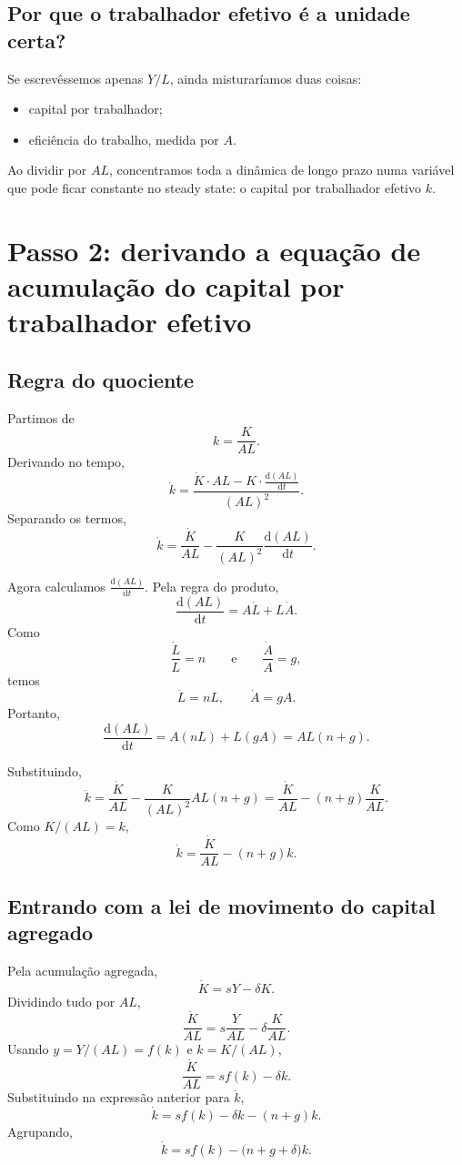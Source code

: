 \documentclass[11pt,a4paper]{article}
\newcommand{\dd}{\mathrm{d}}
\begin{document}
\subsection{Por que o trabalhador efetivo \'e a unidade certa?}

Se escrev\^essemos apenas \(Y/L\), ainda misturar\'iamos duas coisas:
\begin{itemize}
  \item capital por trabalhador;
  \item efici\^encia do trabalho, medida por \(A\).
\end{itemize}
Ao dividir por \(AL\), concentramos toda a din\^amica de longo prazo numa
vari\'avel que pode ficar constante no steady state: o capital por trabalhador
efetivo \(k\).

\section{Passo 2: derivando a equa\c{c}\~ao de acumula\c{c}\~ao do capital por trabalhador efetivo}

\subsection{Regra do quociente}

Partimos de
\[
k=\frac{K}{AL}.
\]
Derivando no tempo,
\[
\dot{k}
=
\frac{\dot K\cdot AL-K\cdot \frac{\dd(AL)}{\dd t}}{(AL)^2}.
\]
Separando os termos,
\[
\dot{k}
=
\frac{\dot K}{AL}
-
\frac{K}{(AL)^2}\frac{\dd(AL)}{\dd t}.
\]

Agora calculamos \(\frac{\dd(AL)}{\dd t}\). Pela regra do produto,
\[
\frac{\dd(AL)}{\dd t}=A\dot L+L\dot A.
\]
Como
\[
\frac{\dot L}{L}=n
\qquad\text{e}\qquad
\frac{\dot A}{A}=g,
\]
temos
\[
\dot L=nL,
\qquad
\dot A=gA.
\]
Portanto,
\[
\frac{\dd(AL)}{\dd t}=A(nL)+L(gA)=AL(n+g).
\]

Substituindo,
\[
\dot{k}
=
\frac{\dot K}{AL}
-
\frac{K}{(AL)^2}AL(n+g)
=
\frac{\dot K}{AL}-(n+g)\frac{K}{AL}.
\]
Como \(K/(AL)=k\),
\[
\dot{k}=\frac{\dot K}{AL}-(n+g)k.
\]

\subsection{Entrando com a lei de movimento do capital agregado}

Pela acumula\c{c}\~ao agregada,
\[
\dot K=sY-\delta K.
\]
Dividindo tudo por \(AL\),
\[
\frac{\dot K}{AL}
=
s\frac{Y}{AL}-\delta\frac{K}{AL}.
\]
Usando \(y=Y/(AL)=f(k)\) e \(k=K/(AL)\),
\[
\frac{\dot K}{AL}=sf(k)-\delta k.
\]
Substituindo na express\~ao anterior para \(\dot{k}\),
\[
\dot{k}=sf(k)-\delta k-(n+g)k.
\]
Agrupando,
\[
\dot{k}=sf(k)-\bigl(n+g+\delta\bigr)k.
\]
\end{document}
